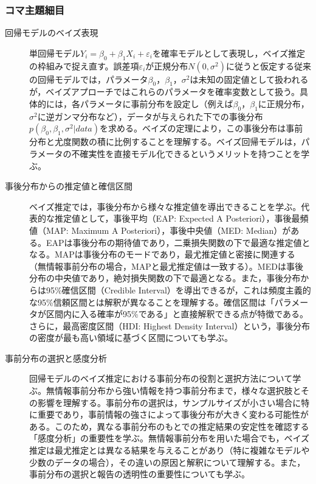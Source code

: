 \subsubsection{コマ主題細目}
\begin{description}
	\item[回帰モデルのベイズ表現] 単回帰モデル$Y_i = \beta_0 + \beta_1 X_i + \varepsilon_i$を確率モデルとして表現し，ベイズ推定の枠組みで捉え直す。誤差項$\varepsilon_i$が正規分布$N(0, \sigma^2)$に従うと仮定する従来の回帰モデルでは，パラメータ$\beta_0$，$\beta_1$，$\sigma^2$は未知の固定値として扱われるが，ベイズアプローチではこれらのパラメータを確率変数として扱う。具体的には，各パラメータに事前分布を設定し（例えば$\beta_0$，$\beta_1$に正規分布，$\sigma^2$に逆ガンマ分布など），データが与えられた下での事後分布$p(\beta_0, \beta_1, \sigma^2 | data)$を求める。ベイズの定理により，この事後分布は事前分布と尤度関数の積に比例することを理解する。ベイズ回帰モデルは，パラメータの不確実性を直接モデル化できるというメリットを持つことを学ぶ。

	\item[事後分布からの推定値と確信区間] ベイズ推定では，事後分布から様々な推定値を導出できることを学ぶ。代表的な推定値として，事後平均（EAP: Expected A Posteriori），事後最頻値（MAP: Maximum A Posteriori），事後中央値（MED: Median）がある。EAPは事後分布の期待値であり，二乗損失関数の下で最適な推定値となる。MAPは事後分布のモードであり，最尤推定値と密接に関連する（無情報事前分布の場合，MAPと最尤推定値は一致する）。MEDは事後分布の中央値であり，絶対損失関数の下で最適となる。また，事後分布からは95\%確信区間（Credible Interval）を導出できるが，これは頻度主義的な95\%信頼区間とは解釈が異なることを理解する。確信区間は「パラメータが区間内に入る確率が95\%である」と直接解釈できる点が特徴である。さらに，最高密度区間（HDI: Highest Density Interval）という，事後分布の密度が最も高い領域に基づく区間についても学ぶ。

	\item[事前分布の選択と感度分析] 回帰モデルのベイズ推定における事前分布の役割と選択方法について学ぶ。無情報事前分布から強い情報を持つ事前分布まで，様々な選択肢とその影響を理解する。事前分布の選択は，サンプルサイズが小さい場合に特に重要であり，事前情報の強さによって事後分布が大きく変わる可能性がある。このため，異なる事前分布のもとでの推定結果の安定性を確認する「感度分析」の重要性を学ぶ。無情報事前分布を用いた場合でも，ベイズ推定は最尤推定とは異なる結果を与えることがあり（特に複雑なモデルや少数のデータの場合），その違いの原因と解釈について理解する。また，事前分布の選択と報告の透明性の重要性についても学ぶ。


\end{description}
